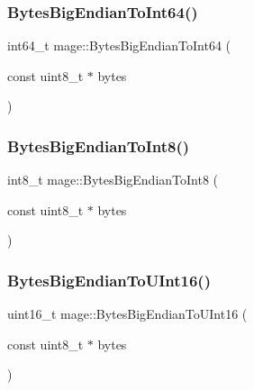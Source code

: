 \subsubsection{\texorpdfstring{Bytes\+Big\+Endian\+To\+Int64()}{BytesBigEndianToInt64()}}
{\footnotesize\ttfamily int64\+\_\+t mage\+::\+Bytes\+Big\+Endian\+To\+Int64 (\begin{DoxyParamCaption}\item[{const uint8\+\_\+t $\ast$}]{bytes }\end{DoxyParamCaption})}

\hypertarget{namespacemage_a7dd5ebfc406cb1d6a8a403a8db29af36}{}\label{namespacemage_a7dd5ebfc406cb1d6a8a403a8db29af36} 
\subsubsection{\texorpdfstring{Bytes\+Big\+Endian\+To\+Int8()}{BytesBigEndianToInt8()}}
{\footnotesize\ttfamily int8\+\_\+t mage\+::\+Bytes\+Big\+Endian\+To\+Int8 (\begin{DoxyParamCaption}\item[{const uint8\+\_\+t $\ast$}]{bytes }\end{DoxyParamCaption})}

\hypertarget{namespacemage_a90b2972b7a2a01d4a911d071303bc400}{}\label{namespacemage_a90b2972b7a2a01d4a911d071303bc400} 
\subsubsection{\texorpdfstring{Bytes\+Big\+Endian\+To\+U\+Int16()}{BytesBigEndianToUInt16()}}
{\footnotesize\ttfamily uint16\+\_\+t mage\+::\+Bytes\+Big\+Endian\+To\+U\+Int16 (\begin{DoxyParamCaption}\item[{const uint8\+\_\+t $\ast$}]{bytes }\end{DoxyParamCaption})}

\hypertarget{namespacemage_aab7d431dcaf0965028de7c5dee9c3da4}{}\label{namespacemage_aab7d431dcaf0965028de7c5dee9c3da4} 
